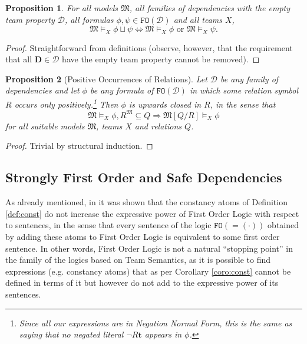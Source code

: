\documentclass{article}
\newtheorem{Theorem}{Theorem}[section]
\newtheorem{Proposition}[Theorem]{Proposition}
\theoremstyle{definition}
\newcommand{\tuple}{\mathbf}
\newcommand{\FO}{\texttt{FO}}
\newcommand{\M}{\mathfrak M}
\newcommand{\D}{\mathbf D}
\newcommand{\DD}{\mathcal D}
\begin{document}
\begin{Proposition}
For all models $\M$, all families of dependencies with the empty team property $\DD$, all formulas $\phi, \psi \in \FO(\DD)$ and all teams $X$, 
\[
\M \models_X \phi \sqcup \psi \Leftrightarrow \M \models_X \phi \text{ or } \M \models_X \psi. 
\]
\label{propo:booldisj}
\end{Proposition}
\begin{proof}
Straightforward from definitions (observe, however, that the requirement that all $\D \in \DD$ have the empty team property cannot be removed). 
\end{proof}

\begin{Proposition}[Positive Occurrences of Relations]
Let $\DD$ be any family of dependencies and let $\phi$ be any formula of $\FO(\DD)$ in which some relation symbol $R$ occurs only positively.\footnote{Since all our expressions are in Negation Normal Form, this is the same as saying that no negated literal $\lnot R \tuple t$ appears in $\phi$.} Then $\phi$ is \emph{upwards closed} in $R$, in the sense that 
\[
\M \models_X \phi, R^\M \subseteq Q \Rightarrow \M[Q/R] \models_X \phi
\]
for all suitable models $\M$, teams $X$ and relations $Q$. 
\label{propo:posTS}
\end{Proposition}
\begin{proof}
Trivial by structural induction.
\end{proof}


\subsection{Strongly First Order and Safe Dependencies}
As already mentioned, in \cite{galliani12} it was shown that the constancy atoms of Definition \ref{def:const} do not increase the expressive power of First Order Logic with respect to sentences, in the sense that every sentence of the logic $\FO(=\!\!(\cdot))$ obtained by adding these atoms to First Order Logic is equivalent to some first order sentence. In other words, First Order Logic is not a natural ``stopping point'' in the family of the logics based on Team Semantics, as it is possible to find expressions (e.g. constancy atoms) that as per Corollary \ref{coro:const} cannot be defined in terms of it but however do not add to the expressive power of its sentences. 
\end{document}
